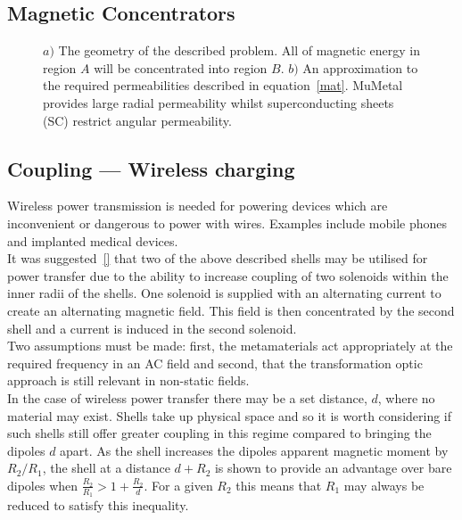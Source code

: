 \documentclass[11pt]{iopart}
\begin{document}

\subsection*{Magnetic Concentrators}
\begin{figure}[!tb] \centering
  \caption{\label{conc} $a)$ The geometry of the described
    problem. All of magnetic energy in region $A$ will be concentrated
    into region $B$. $b)$ An approximation to the required
    permeabilities described in equation~\ref{mat}. MuMetal provides
    large radial permeability whilst superconducting sheets (SC)
    restrict angular permeability.}
\end{figure}

\subsection*{Coupling --- Wireless charging}
Wireless power transmission is needed for powering devices which are
inconvenient or dangerous to power with wires. Examples include mobile
phones and implanted medical devices. \\ It was suggested~\ref{} that
two of the above described shells may be utilised for power transfer
due to the ability to increase coupling of two solenoids within the
inner radii of the shells. One solenoid is supplied with an
alternating current to create an alternating magnetic field. This
field is then concentrated by the second shell and a current is
induced in the second solenoid.\\ Two assumptions must be made: first,
the metamaterials act appropriately at the required frequency in an AC
field and second, that the transformation optic approach is still
relevant in non-static fields.\\

\noindent In the case of wireless power transfer there may be a set
distance, $d$, where no material may exist. Shells take up physical
space and so it is worth considering if such shells still offer
greater coupling in this regime compared to bringing the dipoles $d$
apart. As the shell increases the dipoles apparent magnetic moment by
$R_2/R_1$, the shell at a distance $d+R_2$ is shown to provide an
advantage over bare dipoles when $\frac{R_2}{R_1} >
1+\frac{R_2}{d}$. For a given $R_2$ this means that $R_1$ may always
be reduced to satisfy this inequality.
\end{document}
